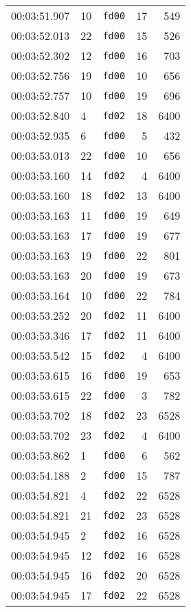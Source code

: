 \documentclass{article}
\begin{document}
\begin{longtable}{lllrr}
00:03:51.907 & 10 & \texttt{fd00} & 17 & 549 \\
00:03:52.013 & 22 & \texttt{fd00} & 15 & 526 \\
00:03:52.302 & 12 & \texttt{fd00} & 16 & 703 \\
00:03:52.756 & 19 & \texttt{fd00} & 10 & 656 \\
00:03:52.757 & 10 & \texttt{fd00} & 19 & 696 \\
00:03:52.840 & 4 & \texttt{fd02} & 18 & 6400 \\
00:03:52.935 & 6 & \texttt{fd00} & 5 & 432 \\
00:03:53.013 & 22 & \texttt{fd00} & 10 & 656 \\
00:03:53.160 & 14 & \texttt{fd02} & 4 & 6400 \\
00:03:53.160 & 18 & \texttt{fd02} & 13 & 6400 \\
00:03:53.163 & 11 & \texttt{fd00} & 19 & 649 \\
00:03:53.163 & 17 & \texttt{fd00} & 19 & 677 \\
00:03:53.163 & 19 & \texttt{fd00} & 22 & 801 \\
00:03:53.163 & 20 & \texttt{fd00} & 19 & 673 \\
00:03:53.164 & 10 & \texttt{fd00} & 22 & 784 \\
00:03:53.252 & 20 & \texttt{fd02} & 11 & 6400 \\
00:03:53.346 & 17 & \texttt{fd02} & 11 & 6400 \\
00:03:53.542 & 15 & \texttt{fd02} & 4 & 6400 \\
00:03:53.615 & 16 & \texttt{fd00} & 19 & 653 \\
00:03:53.615 & 22 & \texttt{fd00} & 3 & 782 \\
00:03:53.702 & 18 & \texttt{fd02} & 23 & 6528 \\
00:03:53.702 & 23 & \texttt{fd02} & 4 & 6400 \\
00:03:53.862 & 1 & \texttt{fd00} & 6 & 562 \\
00:03:54.188 & 2 & \texttt{fd00} & 15 & 787 \\
00:03:54.821 & 4 & \texttt{fd02} & 22 & 6528 \\
00:03:54.821 & 21 & \texttt{fd02} & 23 & 6528 \\
00:03:54.945 & 2 & \texttt{fd02} & 16 & 6528 \\
00:03:54.945 & 12 & \texttt{fd02} & 16 & 6528 \\
00:03:54.945 & 16 & \texttt{fd02} & 20 & 6528 \\
00:03:54.945 & 17 & \texttt{fd02} & 22 & 6528 \\

\end{longtable}
\end{document}
